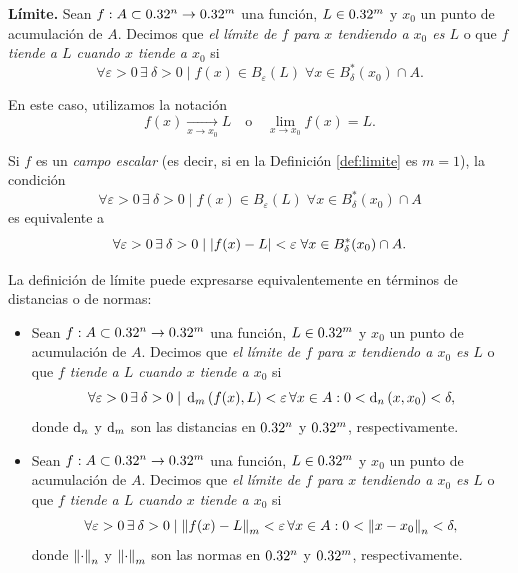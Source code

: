 \label{sec:limites}
\begin{definition} \textbf{L\'imite.} \label{def:limite}
Sean $f:A \subset 0.32^n \to 0.32^m$ una funci\'on, $L \in 0.32^m$ y $x_0$ un punto de acumulaci\'on de $A$. Decimos que \emph{el l\'imite de $f$ para $x$ tendiendo a $x_0$ es $L$} o que \emph{$f$ tiende a $L$ cuando $x$ tiende a $x_0$}
si
\[
 \forall \varepsilon > 0 \, \exists\: \delta > 0 \;|\; f(x) \in B_{\varepsilon}(L) \; \forall 
 x \in B_{\delta}^*(x_0) \cap A.
\]

En este caso, utilizamos la notaci\'on
\[
 f(x) \xrightarrow[x \to x_0]{} L \quad \text{o} \quad \lim_{x \to x_0} f(x) = L.
\]
\begin{obs} Si $f$ es un \emph{campo escalar} (es decir, si en la Definici\'on \eqref{def:limite} es $m = 1$), la condici\'on 
 \[
 \forall \varepsilon > 0 \, \exists\: \delta > 0 \;|\; f(x) \in B_{\varepsilon}(L) \; \forall 
 x \in B_{\delta}^*(x_0) \cap A
\]
es equivalente a 
\[
 \forall \varepsilon > 0 \, \exists\: \delta > 0 \;|\; \abs{ f(x) - L } < \varepsilon \; \forall 
 x \in B_{\delta}^*(x_0) \cap A.
\]
\end{obs}

\begin{obs} La definici\'on de l\'imite puede expresarse equivalentemente en t\'erminos de distancias o de normas:
\begin{itemize} 
 \item Sean $f:A \subset 0.32^n \to 0.32^m$ una funci\'on, $L \in 0.32^m$ y $x_0$ un punto de acumulaci\'on de $A$. Decimos que \emph{el l\'imite de $f$ para $x$ tendiendo a $x_0$ es $L$} o que \emph{$f$ tiende a $L$ cuando $x$ tiende a $x_0$} si
\[
 \forall \varepsilon > 0 \, \exists\: \delta > 0 \;|\; \operatorname{d}_m {(f(x),L)} < \varepsilon \, \forall 
 x\in A : 0 < \operatorname{d}_n {(x,x_0)} < \delta,
\] 
donde $\operatorname{d}_n$ y $\operatorname{d}_m$ son las distancias en $0.32^n$ y $0.32^m$, respectivamente.

 \item Sean $f:A \subset 0.32^n \to 0.32^m$ una funci\'on, $L \in 0.32^m$ y $x_0$ un punto de acumulaci\'on de $A$. Decimos que \emph{el l\'imite de $f$ para $x$ tendiendo a $x_0$ es $L$} o que \emph{$f$ tiende a $L$ cuando $x$ tiende a $x_0$} si
\[
 \forall \varepsilon > 0 \, \exists\: \delta > 0 \;|\; \norm{f(x) - L}_m < \varepsilon \, \forall 
 x\in A : 0 < \norm{x - x_0}_n < \delta,
\] 
donde $\norm{\cdot}_n$ y $\norm{\cdot}_m$ son las normas en $0.32^n$ y $0.32^m$, respectivamente.
\end{itemize}
\end{obs}

\end{definition}

